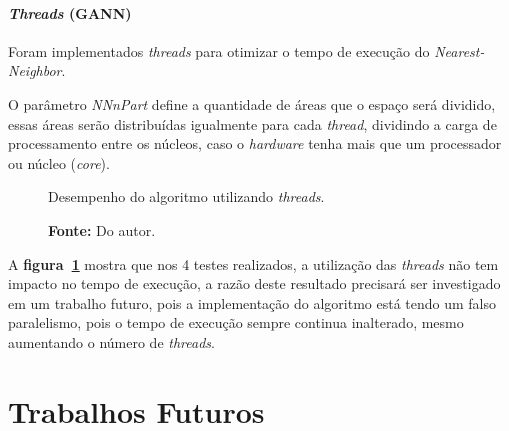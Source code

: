 \documentclass[12pt,openright,a4paper,oneside]{tcc}
\begin{document}
			\subsubsection{\textit{Threads} (GANN)}

			Foram implementados \textit{threads} para otimizar o tempo de execução do \textit{Nearest-Neighbor}. 

			O parâmetro \textit{NNnPart} define a quantidade de áreas que o espaço será dividido, essas áreas serão distribuídas igualmente para cada \textit{thread}, dividindo a carga de processamento entre os núcleos, caso o \textit{hardware} tenha mais que um processador ou núcleo (\textit{core}).

			\begin{figure}[h!]
				\centering
                \caption{Desempenho do algoritmo utilizando \textit{threads}.}
				\caption*{\textbf{Fonte:} Do autor.}
				\label{figthread}
			\end{figure}

			A \textbf{figura~\ref{figthread}} mostra que nos 4 testes realizados, a utilização das \textit{threads} não tem impacto no tempo de execução, a razão deste resultado precisará ser investigado em um trabalho futuro, pois a implementação do algoritmo está tendo um falso paralelismo, pois o tempo de execução sempre continua inalterado, mesmo aumentando o número de \textit{threads}.

			
	\chapter{Trabalhos Futuros}
\end{document}
